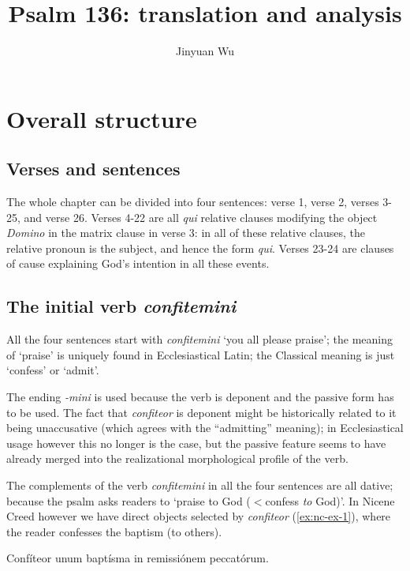 \documentclass[a4paper, 12pt]{article}
\title{Psalm 136: translation and analysis}
\author{Jinyuan Wu}
\newcommand{\form}[1]{\emph{#1}}
\newcommand{\translate}[1]{`#1'}
\newcommand*{\changefrom}{$<$}
\begin{document}
\maketitle

\section{Overall structure}

\subsection{Verses and sentences}

The whole chapter can be divided into four sentences:
verse 1, verse 2, verses 3-25, and verse 26.
Verses 4-22 are all \form{qui} relative clauses modifying 
the object \form{Domino} in the matrix clause in verse 3:
in all of these relative clauses, 
the relative pronoun is the subject, and hence the form \form{qui}.
Verses 23-24 are clauses of cause explaining 
God's intention in all these events.

\subsection{The initial verb \form{confitemini}}

All the four sentences start with \form{confitemini} 
\translate{you all please praise};
the meaning of \translate{praise} is uniquely found in Ecclesiastical Latin;
the Classical meaning is just \translate{confess} or \translate{admit}.

The ending \form{-mini} is used because the verb is deponent
and the passive form has to be used.
The fact that \form{confiteor} is deponent might be 
historically related to it being unaccusative (which agrees with the ``admitting'' meaning);
in Ecclesiastical usage however this no longer is the case, 
but the passive feature seems to have already merged into 
the realizational morphological profile of the verb. 

The complements of the verb \form{confitemini} in all the four sentences 
are all dative; because the psalm asks readers to 
\translate{praise to God (\changefrom confess \emph{to} God)}.
In Nicene Creed however we have direct objects selected by \form{confiteor}
(\ref{ex:nc-ex-1}),
where the reader confesses the baptism (to others).

\begin{exe}
    \ex\label{ex:nc-ex-1} Confíteor unum baptísma in remissiónem peccatórum.
\end{exe}
\end{document}
